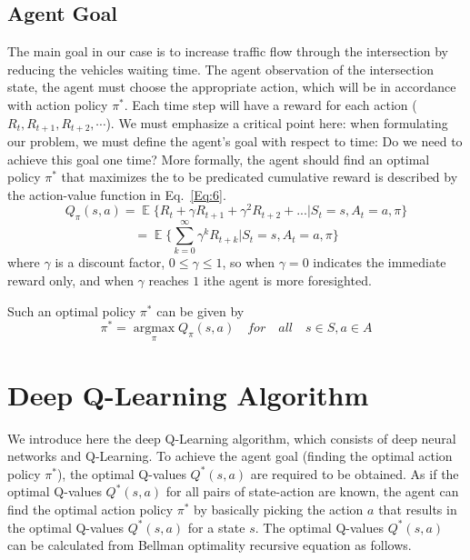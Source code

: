 \documentclass[conference]{IEEEtran}
\begin{document}
\subsection{Agent Goal}
The main goal in our case is to increase traffic flow through the intersection by reducing the vehicles waiting time. The agent observation of the intersection state, the agent must choose the appropriate action, which will be in accordance with action policy $\pi^*$. Each time step will have a reward for each action ($R_{t}, R_{t+1}, R_{t+2}, \cdots$). We must emphasize a critical point here: when formulating our problem, we must define the agent's goal with respect to time: Do we need to achieve this goal one time? More formally, the agent should find an optimal policy $\pi^*$ that maximizes the to be predicated cumulative reward is described by the action-value function in Eq.~\ref{Eq:6}.
\begin{equation}
    \label{Eq:6}
    Q_{\pi}(s,a) = \mathop{\mathbb{E}}\{ R_t+\gamma R_{t+1} + \gamma^2R_{t+2}+...|S_t=s,A_t=a,\pi\}
\end{equation}
\begin{equation*}
    = \mathop{\mathbb{E}}\{\sum_{k=0}^{\infty}\gamma^kR_{t+k}|S_t=s,A_t=a,\pi\}
\end{equation*}
where $\gamma$ is a discount factor, $0\leq\gamma\leq1$, so when $\gamma=0$ indicates the immediate reward only, and when $\gamma$ reaches $1$ ithe agent is more foresighted.

Such an optimal policy $\pi^*$ can be given by
\begin{equation}
    \label{Eq:7}
    \pi^*= \underset{\pi}{\operatorname{argmax}} Q_\pi(s,a) \quad for \quad all \quad s\in S, a \in A
\end{equation}


\section{Deep Q-Learning Algorithm}\label{DNN}

We introduce here the deep Q-Learning algorithm, which consists of deep neural networks and Q-Learning\cite{Q-learning}. To achieve the agent goal (finding the optimal action policy $\pi^*$), the optimal Q-values $Q^*(s,a)$ are required to be obtained. As if the optimal Q-values $Q^*(s,a)$ for all pairs of state-action are known, the agent can find the optimal action policy $\pi^*$ by basically picking the action $a$ that results in the optimal Q-values $Q^*(s,a)$ for a state $s$. The optimal Q-values $Q^*(s,a)$ can be calculated from Bellman optimality recursive equation\cite{RL-Intro} as follows. 
\end{document}
